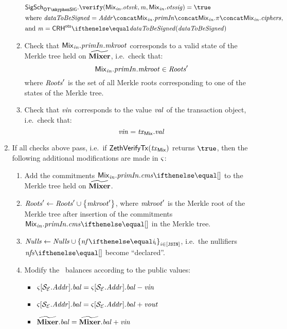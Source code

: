 \begin{enumerate}
\begin{enumerate}
                \begin{align*}
                    & \otsigscheme.\verify(\inp{\mix}.\otsvk, \msg, \inp{\mix}.\otssig) = \true \\
                    & \text{where} \ \datatobesigned = \addr \concat \inp{\mix}.\primInp \concat \inp{\mix}.\zkp \concat \inp{\mix}.\ciphers, \\
                    & \text{and} \ \msg = \crhots{\datatobesigned}
                \end{align*}
            \item Check that $\mathit{{\mathsf{Mix}}_{in}}.\mathit{primIn}.\mathit{mkroot}$ corresponds to a valid state of the Merkle tree held on $\widetilde{\mathbf{Mixer}}$, i.e.~check that:
                \[
                    \mathit{{\mathsf{Mix}}_{in}}.\mathit{primIn}.\mathit{mkroot} \in \mathit{Roots}'
                \]
                where $\mathit{Roots}'$ is the set of all Merkle roots corresponding to one of the states of the Merkle tree.
            \item Check that $\mathit{vin}$ corresponds to the value $\mathit{val}$ of the transaction object, i.e.~check that:
                \[
                    \mathit{vin} = \mathit{\mathit{tx}_{\mathsf{Mix}}}.\mathit{val}
                \]
        \end{enumerate}
    \item If all checks above pass, i.e.~if $\mathsf{ZethVerifyTx}(\mathit{\mathit{tx}_{\mathsf{Mix}}})$ returns $\true$, then the following additional modifications are made in $\mathit{\varsigma}$:
        \begin{enumerate}
            \item Add the commitments $\inp{\mix}.\primInp.\cms{}$ to the Merkle tree held on $\widetilde{\mathbf{Mixer}}$.
            \item $\mathit{Roots}' \gets \mathit{Roots}' \cup \left\{{\mathit{mkroot}'}\right\}$, where $\mathit{mkroot}'$ is the Merkle root of the Merkle tree after insertion of the commitments $\inp{\mix}.\primInp.\cms{}$ in the Merkle tree.
            \item $\nullifierset \gets \nullifierset \cup \indexedset{\nf{i}}{i \in [\jsin]}$, i.e.~the nullifiers $\nfs{}$ become ``declared''.
            \item Modify the \ethereum~balances according to the public values:
                \begin{itemize}
                    \item $\mathit{\varsigma}[\mathcal{{S}_{E}}.\mathit{Addr}].\mathit{bal} = \mathit{\varsigma}[\mathcal{{S}_{E}}.\mathit{Addr}].\mathit{bal} - \mathit{vin}$
                    \item $\mathit{\varsigma}[\mathcal{{S}_{E}}.\mathit{Addr}].\mathit{bal} = \mathit{\varsigma}[\mathcal{{S}_{E}}.\mathit{Addr}].\mathit{bal} + \mathit{vout}$
                    \item $\widetilde{\mathbf{Mixer}}.\mathit{bal} = \widetilde{\mathbf{Mixer}}.\mathit{bal} + \mathit{vin}$

\end{itemize}
\end{enumerate}
\end{enumerate}

